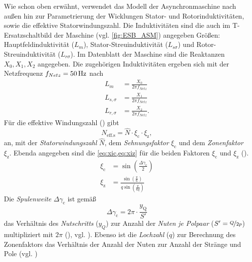 Wie schon oben erwähnt, verwendet das Modell der Asynchronmaschine nach außen hin zur Parametrierung der Wicklungen Stator- und Rotorinduktivitäten, sowie die effektive Statorwindungszahl. Die Induktivitäten sind die auch im T-Ersatzschaltbild der Maschine (vgl. \cref{fig:ESB_ASM}) angegeben Größen: Hauptfeldinduktivität (\(L_m\)), Stator-Streuinduktivität (\(L_{s\sigma}\)) und Rotor-Streuinduktivität (\(L_{r\sigma}\)). Im Datenblatt der Maschine sind die Reaktanzen \(X_0, X_1, X_2\) angegeben. Die zugehörigen Induktivitäten ergeben sich mit der Netzfrequenz \(f_{Netz}=\unit[50]{\mathrm{Hz}}\) nach
\begin{align}
    L_m &= \frac{X_0}{2\pi f_{Netz}} \\
    L_{s,\sigma} &= \frac{X_1}{2\pi f_{Netz}} \\
    L_{r,\sigma} &= \frac{X_2}{2\pi f_{Netz}}.
\end{align}
Für die effektive Windungszahl () gibt \cite[S. 217]{kralModelicaObjektorientierteModellbildung2019}
\begin{equation}
    N_{\mathrm{eff. s}} = \hat{N}\cdot\xi_{\mathrm{c}}\cdot\xi_{\mathrm{z}}\label{eq:effStatorTurns},
\end{equation}
an, mit der \emph{Statorwindungszahl} \(\hat{N}\), dem \emph{Sehnungsfaktor} \(\xi _{\mathrm{c}}\) und dem \emph{Zonenfaktor} \(\xi _{\mathrm{z}}\). Ebenda angegeben sind die \cref{eq:xic,eq:xiz} für die beiden Faktoren \(\xi _{\mathrm{c}}\) und \(\xi_{\mathrm{z}}\) (\cite[S. 165, S. 217]{kralModelicaObjektorientierteModellbildung2019}).
\begin{align}
    \xi _{\mathrm{c}} &= \sin(\frac{\Delta\gamma _{\mathrm{c}}}{2}) \label{eq:xic}\\
    \xi _{\mathrm{z}} &= \frac{\sin(\frac{\pi}{6})}{q\sin(\frac{\pi}{6q})}\label{eq:xiz}
\end{align}
Die \emph{Spulenweite} \(\Delta\gamma _{\mathrm{c}}\) ist gemäß
\begin{equation}
    \Delta\gamma _{\mathrm{c}} = 2\pi\cdot\frac{y _{\mathrm{Q}}}{S'}
\end{equation}
das Verhältnis des \emph{Nutschritts} (\(y_Q\)) zur Anzahl der \emph{Nuten je Polpaar} (\(S'=\nicefrac{Q}{2p}\)) multipliziert mit \(2\pi\) (\cite[S. 168, S. 161]{kralModelicaObjektorientierteModellbildung2019}), vgl. \cite[S. 76, S. 119]{binderElektrischeMaschinenUnd2012}). Ebenso ist die \emph{Lochzahl} (\(q\)) zur Berechnung des Zonenfaktors das Verhältnis der Anzahl der Nuten zur Anzahl der Stränge und Pole (vgl. \cite[S. 151]{kralModelicaObjektorientierteModellbildung2019})
